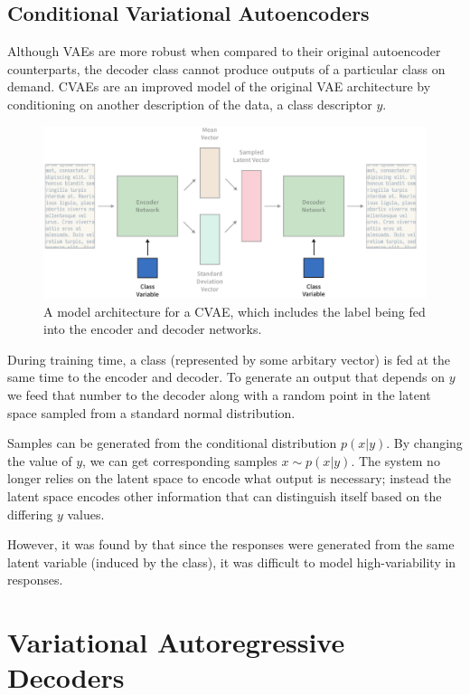 \documentclass[12pt,twoside]{report}
\begin{document}
\subsection{Conditional Variational Autoencoders}

Although VAEs are more robust when compared to their original autoencoder counterparts, the decoder class cannot produce outputs of a particular class on demand. CVAEs are an improved model of the original VAE architecture by conditioning on another description of the data, a class descriptor $y$. 

\begin{figure}[!ht]
      
	\centering
	\includegraphics[width=150mm]{diagrams/conditional_variational_autoencoders.pdf}
	\caption{A model architecture for a CVAE, which includes the label being fed into the encoder and decoder networks. \label{cvae_diagram}}
  \end{figure}

During training time, a class (represented by some arbitary vector) is fed at the same time to the encoder and decoder. To generate an output that depends on $y$ we feed that number to the decoder along with a random point in the latent space sampled from a standard normal distribution.

Samples can be generated from the conditional distribution $p(x|y)$. By changing the value of $y$, we can get corresponding samples $x \sim p(x|y)$. The system no longer relies on the latent space to encode what output is necessary; instead the latent space encodes other information that can distinguish itself based on the differing $y$ values.

However, it was found by \cite{du_variational_2018} that since the responses were generated from the same latent variable (induced by the class), it was difficult to model high-variability in responses.

\section{Variational Autoregressive Decoders}
\end{document}
